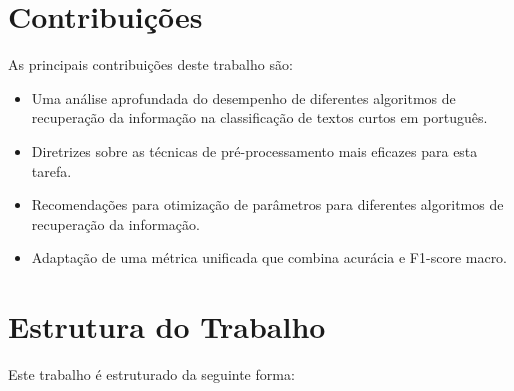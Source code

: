 \section{Contribuições}

As principais contribuições deste trabalho são:

\begin{itemize}
    \item Uma análise aprofundada do desempenho de diferentes algoritmos de recuperação da informação na classificação de textos curtos em português.
    \item Diretrizes sobre as técnicas de pré-processamento mais eficazes para esta tarefa.
    \item Recomendações para otimização de parâmetros para diferentes algoritmos de recuperação da informação.
    \item Adaptação de uma métrica unificada que combina acurácia e F1-score macro.
\end{itemize}





\section{Estrutura do Trabalho}

Este trabalho é estruturado da seguinte forma:

